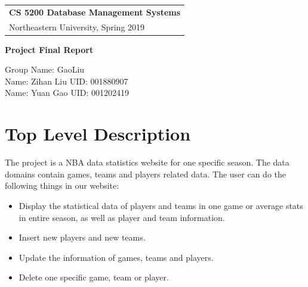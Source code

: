 \documentclass[a4paper,12pt]{article} %
\begin{document}
\thispagestyle{empty} %

\begin{tabular}{p{15.5cm}} %
{\large \bf CS 5200 Database Management Systems} \\
Northeastern University, Spring 2019  \\
\hline %
\end{tabular} %

\vspace*{0.3cm} %

\begin{center} %
    {\Large \bf Project Final Report} %
    \vspace{2mm}
    
    {Group Name: GaoLiu}\\
    {Name: Zihan Liu UID: 001880907}\\
    {Name: Yuan Gao UID: 001202419}
\end{center} 
%
\vspace{0.2cm}
\section{Top Level Description}
The project is a NBA data statistics website for one specific season. 
The data domains contain games, teams and players related data. The user can do the following things in our website:
\begin{itemize}
    \item Display the statistical data of players and teams in one game or average stats in entire season, as well as player and team information.
    \item Insert new players and new teams.
    \item Update the information of games, teams and players.
    \item Delete one specific game, team or player.
\end{itemize}
\end{document}
